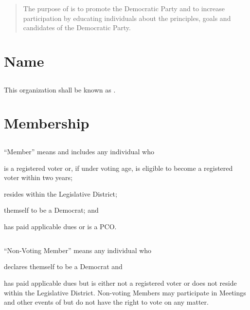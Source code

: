 \begin{abstract}
The purpose of \thedistrict{}  is to promote the Democratic Party and to increase participation by educating individuals about the principles, goals and candidates of the Democratic Party.
\end{abstract}

\section{Name}
\subsection{}
This organization shall be known as \thedistrict{}.

\section{Membership}
\subsection{} \label{member}
“Member” means and includes any individual who
\begin{inlinealphalist}
    \item is a registered voter or, if under voting age, is eligible to become a registered voter within two years;
    \item resides within the \fortythird{} Legislative District;
    \item themself to be a Democrat; and
    \item has paid applicable dues or is a PCO.
\end{inlinealphalist}

\subsection{} \label{non-voting-member}
“Non-Voting Member” means any individual who
\begin{inlinealphalist}
    \item declares themself to be a Democrat and
    \item has paid applicable dues but is either not a registered voter or does not reside within the \fortythird{} Legislative District. Non-voting Members may participate in Meetings and other events of \thedistrict{} but do not have the right to vote on any matter.
\end{inlinealphalist}

